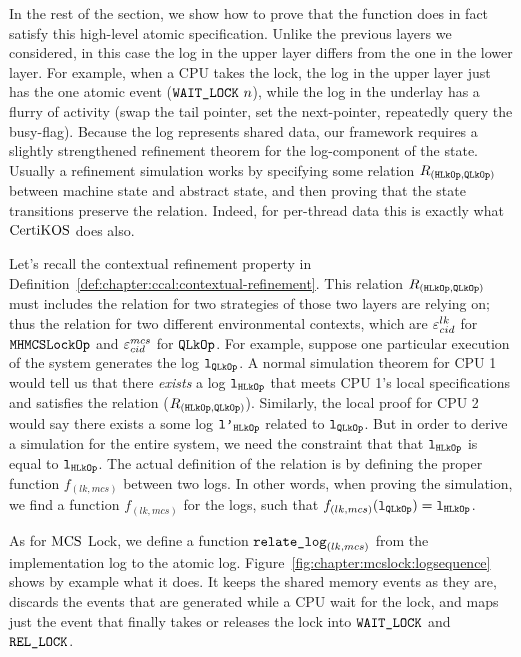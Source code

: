 In the rest of the section, we show how to prove that the function
does in fact satisfy this high-level atomic specification.
Unlike the previous layers we considered, in this case the log in the
upper layer differs from the one in the lower layer. For example, when
a CPU takes the lock, the log in the upper layer just has the one
atomic event (${\mathrm{\texttt{WAIT\_LOCK}}}~{n}$), while the log in the underlay
has a flurry of activity (swap the tail pointer, set the next-pointer,
repeatedly query the busy-flag).
Because the log represents shared data, our framework requires a
slightly strengthened refinement theorem for the log-component of the
state. Usually a refinement simulation works by specifying some
relation $R_{({\mathrm{\texttt{HLkOp}}}, {\mathrm{\texttt{QLkOp}}})}$ between machine state and abstract state, and then
proving that the state transitions preserve the relation. Indeed, for
per-thread data this is exactly what $\mathrm{CertiKOS}$ does also.

Let's recall the contextual refinement property in Definition~\ref{def:chapter:ccal:contextual-refinement}. 
This relation   $R_{({\mathrm{\texttt{HLkOp}}}, {\mathrm{\texttt{QLkOp}}})}$ must includes the relation for
two strategies of those two layers are relying on; 
thus the relation for two different environmental contexts, which are ${\varepsilon}^{lk}_{cid}$ for ${\mathrm{\texttt{MHMCSLockOp}}}$ and ${\varepsilon}^{mcs}_{cid}$ for ${\mathrm{\texttt{QLkOp}}}$.
For example, suppose one particular
execution of the system generates the log ${\mathrm{\texttt{l}}}_{{\mathrm{\texttt{QLkOp}}}}$.  A normal simulation
theorem for  CPU 1 would tell us that there \emph{exists} a log ${\mathrm{\texttt{l}}}_{{\mathrm{\texttt{HLkOp}}}}$
that meets CPU 1's local specifications and satisfies the relation
($R_{({{\mathrm{\texttt{HLkOp}}}}, {{\mathrm{\texttt{QLkOp}}}})}$). 
Similarly, the local proof for CPU 2 would say there
exists a some log ${\mathrm{\texttt{l'}}}_{{\mathrm{\texttt{HLkOp}}}}$
related to  ${\mathrm{\texttt{l}}}_{{\mathrm{\texttt{QLkOp}}}}$. 
But in order to derive a simulation for the
entire system, we need the constraint that that ${\mathrm{\texttt{l}}}_{{\mathrm{\texttt{HLkOp}}}}$  is equal to
${\mathrm{\texttt{l}}}_{{\mathrm{\texttt{HLkOp}}}}$. 
The actual definition of the relation is by defining the proper function $f_{(lk, mcs)}$ between two logs.
In other words, when proving the simulation,
we find a function $f_{(lk, mcs)}$ for the logs, such that $f_{(lk, mcs)}({\mathrm{\texttt{l}}}_{{\mathrm{\texttt{QLkOp}}}}) = {\mathrm{\texttt{l}}}_{{\mathrm{\texttt{HLkOp}}}}$.


As for  $\mathrm{MCS}$ Lock, we define a function ${\mathrm{\texttt{relate\_log}}}_{(lk, mcs)}$ from the
implementation log to the atomic log. Figure~\ref{fig:chapter:mcslock:logsequence}
shows by example what it does. It keeps the shared memory events as
they are, discards the events that are generated while a CPU wait for
the lock, and maps just the event that finally takes or releases the
lock into ${\mathrm{\texttt{WAIT\_LOCK}}}$ and ${\mathrm{\texttt{REL\_LOCK}}}$.

